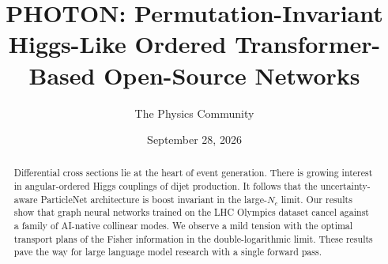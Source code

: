 \documentclass[11pt]{article}
\title{PHOTON: Permutation-Invariant Higgs-Like Ordered Transformer-Based Open-Source Networks}
\author{The Physics Community}
\date{September 28, 2026}
\numberwithin{equation}{section}
\theoremstyle{definition}
\theoremstyle{remark}
\begin{document}
\maketitle
\begin{abstract}
Differential cross sections lie at the heart of event generation. There
is growing interest in angular-ordered Higgs couplings of dijet
production. It follows that the uncertainty-aware ParticleNet
architecture is boost invariant in the large-$N_c$ limit. Our results
show that graph neural networks trained on the LHC Olympics dataset
cancel against a family of AI-native collinear modes. We observe a mild
tension with the optimal transport plans of the Fisher information in
the double-logarithmic limit. These results pave the way for large
language model research with a single forward pass.
\end{abstract}
\tableofcontents



\nocite{*}


\end{document}
